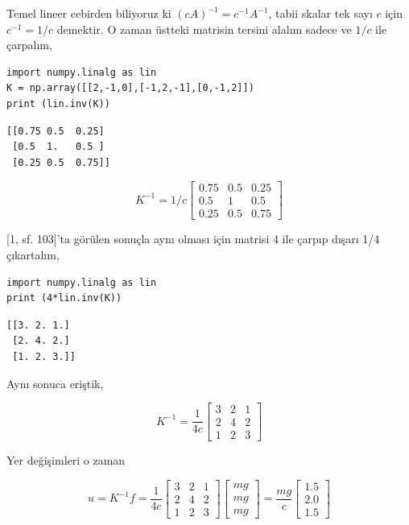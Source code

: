\documentclass[12pt,fleqn]{article}\usepackage{../../common}
\begin{document}
Temel lineer cebirden biliyoruz ki $(cA)^{-1} = c^{-1} A^{-1}$, tabii
skalar tek sayı $c$ için $c^{-1} = 1/c$ demektir. O zaman üstteki matrisin
tersini alalım sadece ve $1/c$ ile çarpalım,

\begin{verbatim}
import numpy.linalg as lin
K = np.array([[2,-1,0],[-1,2,-1],[0,-1,2]])
print (lin.inv(K))
\end{verbatim}

\begin{verbatim}
[[0.75 0.5  0.25]
 [0.5  1.   0.5 ]
 [0.25 0.5  0.75]]
\end{verbatim}

$$ K^{-1} = 1/c
\left[\begin{array}{rrr}
0.75   &     0.5 &       0.25 \\
0.5       & 1 &     0.5 \\
0.25         & 0.5     &      0.75
\end{array}\right]
$$

[1, sf. 103]'ta görülen sonuçla aynı olması için matrisi 4 ile çarpıp dışarı
1/4 çıkartalım,

\begin{verbatim}
import numpy.linalg as lin
print (4*lin.inv(K))
\end{verbatim}

\begin{verbatim}
[[3. 2. 1.]
 [2. 4. 2.]
 [1. 2. 3.]]
\end{verbatim}

Aynı sonuca eriştik,

$$ K^{-1} = \frac{1}{4c}
\left[\begin{array}{rrr}
3 & 2 & 1 \\ 2 & 4 & 2 \\ 1 & 2 & 3
\end{array}\right]
$$

Yer değişimleri o zaman 

$$
u = K^{-1} f = \frac{1}{4c}
\left[\begin{array}{rrr}
3 & 2 & 1 \\ 2 & 4 & 2 \\ 1 & 2 & 3
\end{array}\right]
\left[\begin{array}{r}
mg \\ mg \\ mg
\end{array}\right] =
\frac{mg}{c}
\left[\begin{array}{r}
1.5 \\ 2.0 \\ 1.5
\end{array}\right]
$$
\end{document}
